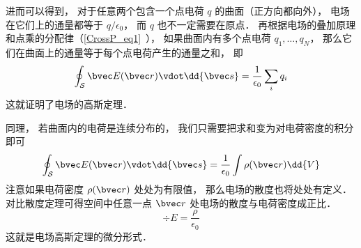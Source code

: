 进而可以得到， 对于任意两个包含一个点电荷 $q$ 的曲面（正方向都向外）， 电场在它们上的通量都等于 $q/\epsilon_0$， 而 $q$ 也不一定需要在原点． 再根据电场的叠加原理和点乘的分配律（\autoref{CrossP_eq1}~）， 如果曲面内有多个点电荷 $q_1, \dots, q_N$， 那么它们在曲面上的通量等于每个点电荷产生的通量之和， 即
\begin{equation}
\oint_{\mathcal S} \bvec E(\bvec r) \vdot \dd{\bvec s} = \frac{1}{\epsilon_0} \sum_i q_i
\end{equation}
这就证明了电场的高斯定理．

同理， 若曲面内的电荷是连续分布的， 我们只需要把求和变为对电荷密度的积分即可
\begin{equation}
\oint_{\mathcal S} \bvec E(\bvec r) \vdot \dd{\bvec s} = \frac{1}{\epsilon_0} \int \rho(\bvec r) \dd{V}
\end{equation}
注意如果电荷密度 $\rho(\bvec r)$ 处处为有限值， 那么电场的散度也将处处有定义． 对比散度定理可得空间中任意一点 $\bvec r$ 处电场的散度与电荷密度成正比．
\begin{equation}
\div E = \frac{\rho}{\epsilon_0}
\end{equation}
这就是电场高斯定理的微分形式．
